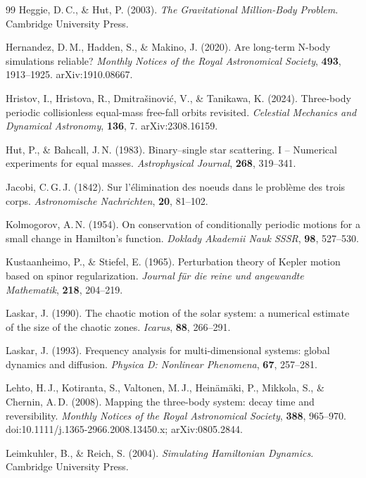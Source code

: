 \documentclass[11pt,a4paper]{article}
\begin{document}
\begin{thebibliography}{99}
Heggie, D.\,C., \& Hut, P. (2003).
\textit{The Gravitational Million-Body Problem}.
Cambridge University Press.

Hernandez, D.\,M., Hadden, S., \& Makino, J. (2020).
Are long-term N-body simulations reliable?
\textit{Monthly Notices of the Royal Astronomical Society}, \textbf{493}, 1913--1925.
arXiv:1910.08667.

Hristov, I., Hristova, R., Dmitra{\v{s}}inovi{\'c}, V., \& Tanikawa, K. (2024).
Three-body periodic collisionless equal-mass free-fall orbits revisited.
\textit{Celestial Mechanics and Dynamical Astronomy}, \textbf{136}, 7.
arXiv:2308.16159.

Hut, P., \& Bahcall, J.\,N. (1983).
Binary--single star scattering. I -- Numerical experiments for equal masses.
\textit{Astrophysical Journal}, \textbf{268}, 319--341.

Jacobi, C.\,G.\,J. (1842).
Sur l'\'{e}limination des noeuds dans le probl\`{e}me des trois corps.
\textit{Astronomische Nachrichten}, \textbf{20}, 81--102.

Kolmogorov, A.\,N. (1954).
On conservation of conditionally periodic motions for a small change in Hamilton's function.
\textit{Doklady Akademii Nauk SSSR}, \textbf{98}, 527--530.

Kustaanheimo, P., \& Stiefel, E. (1965).
Perturbation theory of Kepler motion based on spinor regularization.
\textit{Journal f\"{u}r die reine und angewandte Mathematik}, \textbf{218}, 204--219.

Laskar, J. (1990).
The chaotic motion of the solar system: a numerical estimate of the size of the chaotic zones.
\textit{Icarus}, \textbf{88}, 266--291.

Laskar, J. (1993).
Frequency analysis for multi-dimensional systems: global dynamics and diffusion.
\textit{Physica D: Nonlinear Phenomena}, \textbf{67}, 257--281.

Lehto, H.\,J., Kotiranta, S., Valtonen, M.\,J., Heinäm\"{a}ki, P., Mikkola, S., \& Chernin, A.\,D. (2008).
Mapping the three-body system: decay time and reversibility.
\textit{Monthly Notices of the Royal Astronomical Society}, \textbf{388}, 965--970.
doi:10.1111/j.1365-2966.2008.13450.x; arXiv:0805.2844.

Leimkuhler, B., \& Reich, S. (2004).
\textit{Simulating Hamiltonian Dynamics}.
Cambridge University Press.


\end{thebibliography}
\end{document}
